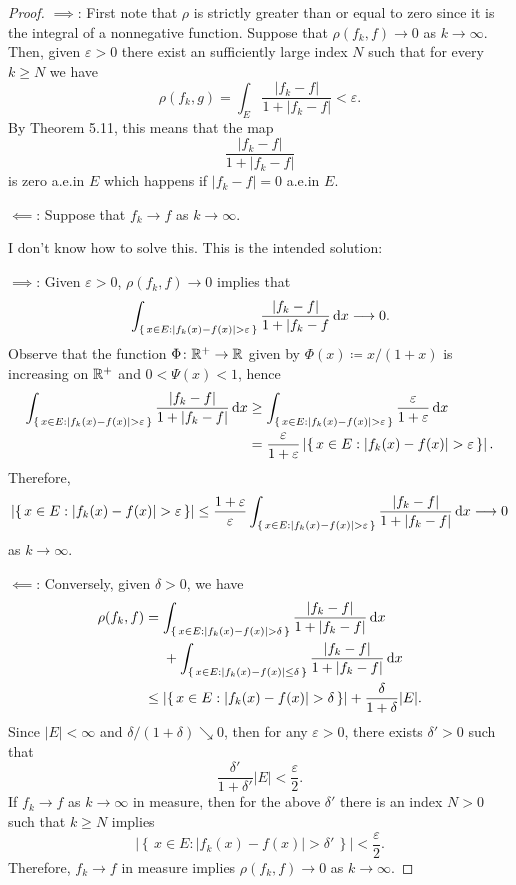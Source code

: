 \begin{proof}
$\implies$: First note that $\rho$ is strictly greater than or equal to
zero since it is the integral of a nonnegative function. Suppose that
$\rho(f_k,f)\to 0$ as $k\to\infty$. Then, given $\varepsilon>0$ there exist
an sufficiently large index $N$ such that for every $k\geq N$ we have
\begin{equation}
\label{eq:hypothesis-4}
\rho(f_k,g)=\int_E\frac{|f_k-f|}{1+|f_k-f|}<\varepsilon.
\end{equation}
By Theorem 5.11, this means that the map
\[
\frac{|f_k-f|}{1+|f_k-f|}
\]
is zero a.e.\@ in $E$ which happens if $|f_k-f|=0$ a.e.\@ in $E$.

$\impliedby$: Suppose that $f_k\to f$ as $k\to\infty$.

\bigskip

I don't know how to solve this. This is the intended solution:

$\implies$: Given $\varepsilon>0$, $\rho(f_k,f)\to 0$ implies that
\[
\int_{\left\{\,x\in
    E:|f_k(x)-f(x)|>\varepsilon\,\right\}}\frac{|f_k-f|}{1+|f_k-f}\diff
x\longrightarrow 0.
\]
Observe that the function $\Phi\colon\mathbb{R}^+\to\mathbb{R}$ given by
$\Phi(x)\coloneqq x/(1+x)$ is increasing on $\mathbb{R}^+$ and $0<\Psi(x)<1$,
hence
\[
\begin{aligned}
  \int_{\left\{\,x\in
      E:|f_k(x)-f(x)|>\varepsilon\,\right\}}\frac{|f_k-f|}{1+|f_k-f|}\diff
  x
&\geq\int_{\left\{\,x\in
    E:|f_k(x)-f(x)|>\varepsilon\,\right\}}\frac{\varepsilon}{1+\varepsilon}\diff
x\\
&=\frac{\varepsilon}{1+\varepsilon}
\left|\left\{\,x\in E:|f_k(x)-f(x)|>\varepsilon\,\right\}\right|.
\end{aligned}
\]
Therefore,
\[
\left|\left\{\,x\in E:|f_k(x)-f(x)|>\varepsilon\,\right\}\right|
\leq\frac{1+\varepsilon}{\varepsilon}
\int_{\left\{\,x\in
    E:|f_k(x)-f(x)|>\varepsilon\,\right\}}\frac{|f_k-f|}{1+|f_k-f|}\diff x
\longrightarrow 0
\]
as $k\to\infty$.

$\impliedby$: Conversely, given $\delta>0$, we have
\[
\begin{aligned}
\rho(f_k,f)
&=\int_{\left\{\,x\in E:|f_k(x)-f(x)|>\delta\,\right\}}\frac{|f_k-f|}{1+|f_k-f|}\diff x\\
&\phantom{{}={}}+\int_{\left\{\,x\in
    E:|f_k(x)-f(x)|\leq\delta\,\right\}}\frac{|f_k-f|}{1+|f_k-f|}\diff x\\
&\leq\left|\left\{\,x\in
    E:|f_k(x)-f(x)|>\delta\,\right\}\right|+\frac{\delta}{1+\delta}|E|.
\end{aligned}
\]
Since $|E|<\infty$ and $\delta/(1+\delta)\searrow 0$, then for any
$\varepsilon>0$, there exists $\delta'>0$ such that
\[
\frac{\delta'}{1+\delta'}|E|<\frac{\varepsilon}{2}.
\]
If $f_k\to f$ as $k\to\infty$ in measure, then for the above $\delta'$
there is an index $N>0$ such that $k\geq N$ implies
\[
\left|\left\{\,x\in E:|f_k(x)-f(x)|>\delta'\,\right\}\right|<\frac{\varepsilon}{2}.
\]
Therefore, $f_k\to f$ in measure implies $\rho(f_k,f)\to 0$ as $k\to\infty$.
\end{proof}

